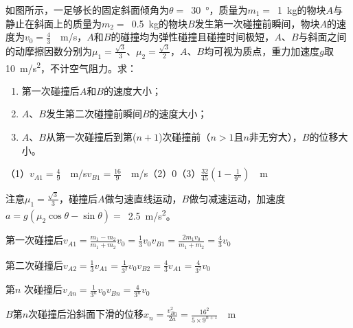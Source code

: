 如图所示，一足够长的固定斜面倾角为\(\theta =\) \,\qty{30}{\degree}，质量为\(m_1 =\) \,\qty{1}{kg}的物块\(A\)与静止在斜面上的质量为\(m_2 =\) \,\qty{0.5}{kg}的物块\(B\)发生第一次碰撞前瞬间，物块\(A\)的速度为\(v_0 = \frac{4}{3}\) \,\qty{}{m/s}，\(A\)和\(B\)的碰撞均为弹性碰撞且碰撞时间极短，\(A\)、\(B\)与斜面之间的动摩擦因数分别为\(\mu_1 = \frac{\sqrt{3}}{3}\)、\(\mu_2 = \frac{\sqrt{3}}{2} \)，\(A\)、\(B\)均可视为质点，重力加速度\(g\)取\,\qty{10}{m/s^2}，不计空气阻力。求：
\begin{enumerate}
    \item 第一次碰撞后\(A\)和\(B\)的速度大小；
    \item \(A\)、\(B\)发生第二次碰撞前瞬间\(B\)的速度大小；
    \item \(A\)、\(B\)从第一次碰撞后到第(\(n + 1\))次碰撞前（\(n > 1\)且\(n\)非无穷大），\(B\)的位移大小。
\end{enumerate}
\begin{answer}
    （1）\(v_{A1} = \frac{4}{9}\) \,\qty{}{m/s}\quad \(v_{B1} = \frac{16}{9}\) \,\qty{}{m/s}（2）0（3）\(\frac{32}{45}(1 - \frac{1}{9^n})\) \,\qty{}{m}

    注意\(\mu_1 = \frac{\sqrt{3}}{3} \)，碰撞后\(A\)做匀速直线运动，\(B\)做匀减速运动，加速度\(a = g(\mu_2\cos\theta - \sin\theta) =\) \,\qty{2.5}{m/s^2}。

    第一次碰撞后\(v_{A1} = \frac{m_1 - m_2}{m_1 + m_2}v_0 = \frac{1}{3}v_0\)\quad \(v_{B1} = \frac{2m_1v_0}{m_1 + m_2} = \frac{4}{3}v_0\)

    第二次碰撞后\(v_{A2} = \frac{1}{3}v_{A1} = \frac{1}{3^2}v_0\)\quad \(v_{B2}= \frac{4}{3}v_{A1} = \frac{4}{3^2}v_0\)

    第\(n\) 次碰撞后\(v_{An} = \frac{1}{3^n}v_0\)\quad \(v_{Bn} = \frac{4}{3^n}v_0\)

    \(B\)第\(n\)次碰撞后沿斜面下滑的位移\(x_n = \frac{v_{Bn}^2}{2a} = \frac{16^2}{5 \times 9^{n + 1}}\) \,\qty{}{m}
\end{answer}